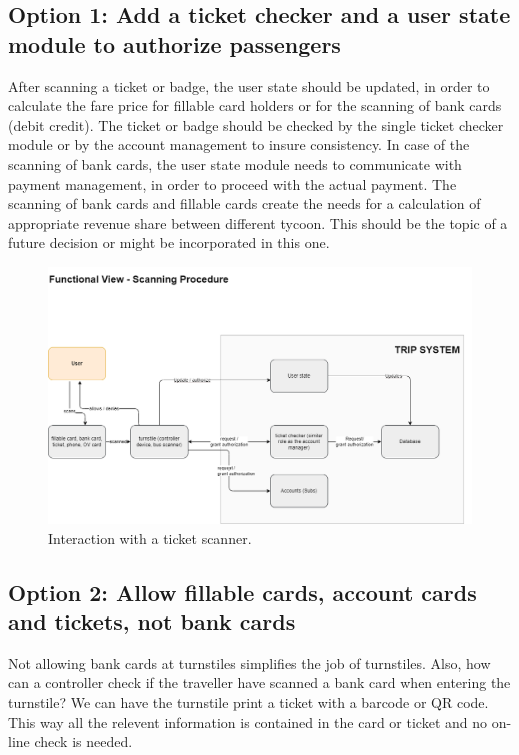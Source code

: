 \subsection*{Option 1: Add a ticket checker and a user state module to authorize passengers}
After scanning a ticket or badge, the user state should be updated, in order to calculate the fare price for fillable card holders or for the scanning of bank cards (debit credit).
The ticket or badge should be checked by the single ticket checker module or by the account management to insure consistency.
In case of the scanning of bank cards, the user state module needs to communicate with payment management, in order to proceed with the actual payment.
The scanning of bank cards and fillable cards create the needs for a calculation of appropriate revenue share between different tycoon. This should be the topic of a future decision or might be incorporated in this one.
\begin{figure}[ht]
    \centering
    \includegraphics[width=\textwidth]{drawings/views_draft2/functional_view turnstiles.png}
    \caption{Interaction with a ticket scanner.}
    \label{fig:ticket_scanner}
\end{figure}

\subsection*{Option 2: Allow fillable cards, account cards and tickets, not bank cards}
Not allowing bank cards at turnstiles simplifies the job of turnstiles.
Also, how can a controller check if the traveller have scanned a bank card when entering the turnstile?
We can have the turnstile print a ticket with a barcode or QR code.
This way all the relevent information is contained in the card or ticket and no on-line check is needed. 


